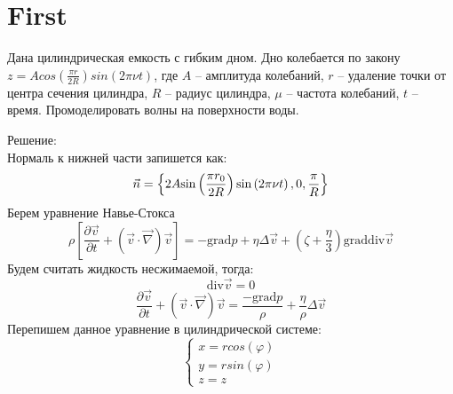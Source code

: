 \chapter{First}

Дана цилиндрическая емкость с гибким дном. 
Дно колебается по закону 
$z = A cos(\frac{\pi r}{2R}) sin(2\pi\nu t)$,
где $A$ -- амплитуда колебаний, $r$ -- удаление 
точки от центра сечения цилиндра, $R$ -- радиус 
цилиндра, $\mu$ -- частота колебаний, $t$ -- время.
Промоделировать волны на поверхности воды.

Решение: \\
Нормаль к нижней части запишется как:
$$
    \vec{n} = 
    \left\{ 
            2A \text{sin}\left( \frac{\pi r_0}{2R} \right)\text{sin}\left( 2\pi \nu t \right), \\
            0, \\
            \frac{\pi}{R}
    \right\}        
$$
Берем уравнение Навье-Стокса 
\begin{equation}
    \rho \left[\frac{\partial{\vec{v}}}{\partial{t}}+\left(\vec{v}\cdot\vec{\nabla}\right)\vec{v}\right] = 
    -\text{grad}p + \eta \Delta\vec{v} + (\zeta + \frac{\eta}{3})\text{grad}\text{div}\vec{v}
\end{equation}
Будем считать жидкость несжимаемой, тогда:
\begin{equation}
    \text{div}\vec{v} = 0
\end{equation}
\begin{equation}
    \frac{\partial{\vec{v}}}{\partial{t}}+\left(\vec{v}\cdot\vec{\nabla}\right)\vec{v} = 
    \frac{-\text{grad}p}{\rho} + \frac{\eta}{\rho} \Delta\vec{v}
\end{equation}
Перепишем данное уравнение в цилиндрической системе:
\begin{equation}
    \begin{cases}
        x = r cos(\varphi) \\
        y = r sin(\varphi) \\
        z = z 
    \end{cases}
\end{equation}
